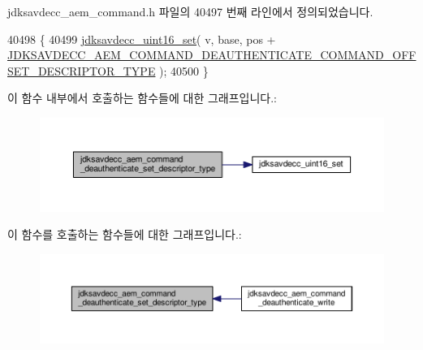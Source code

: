 jdksavdecc\+\_\+aem\+\_\+command.\+h 파일의 40497 번째 라인에서 정의되었습니다.


\begin{DoxyCode}
40498 \{
40499     \hyperlink{group__endian_ga14b9eeadc05f94334096c127c955a60b}{jdksavdecc\_uint16\_set}( v, base, pos + 
      \hyperlink{group__command__deauthenticate_ga40e437a448eab318b5db1005a69df070}{JDKSAVDECC\_AEM\_COMMAND\_DEAUTHENTICATE\_COMMAND\_OFFSET\_DESCRIPTOR\_TYPE}
       );
40500 \}
\end{DoxyCode}


이 함수 내부에서 호출하는 함수들에 대한 그래프입니다.\+:
\nopagebreak
\begin{figure}[H]
\begin{center}
\leavevmode
\includegraphics[width=350pt]{group__command__deauthenticate_ga282ebdade6638f9e29f0eb037d7c9825_cgraph}
\end{center}
\end{figure}




이 함수를 호출하는 함수들에 대한 그래프입니다.\+:
\nopagebreak
\begin{figure}[H]
\begin{center}
\leavevmode
\includegraphics[width=350pt]{group__command__deauthenticate_ga282ebdade6638f9e29f0eb037d7c9825_icgraph}
\end{center}
\end{figure}


